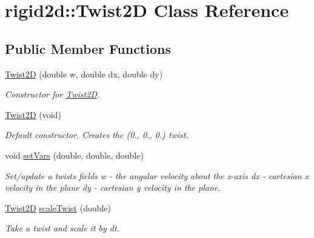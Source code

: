 \hypertarget{classrigid2d_1_1Twist2D}{}\section{rigid2d\+:\+:Twist2D Class Reference}
\label{classrigid2d_1_1Twist2D}
\subsection*{Public Member Functions}
\begin{DoxyCompactItemize}
\item 
\hyperlink{classrigid2d_1_1Twist2D_af389fe01053df9f380a252acb27bd2a7}{Twist2D} (double w, double dx, double dy)
\begin{DoxyCompactList}\small\item\em Constructor for \hyperlink{classrigid2d_1_1Twist2D}{Twist2D}. \end{DoxyCompactList}\item 
\mbox{\label{classrigid2d_1_1Twist2D_a3c6a0ed4e27f7c179ccc1fac93d4ac30}} 
\hyperlink{classrigid2d_1_1Twist2D_a3c6a0ed4e27f7c179ccc1fac93d4ac30}{Twist2D} (void)
\begin{DoxyCompactList}\small\item\em Default constructor. Creates the (0., 0., 0.) twist. \end{DoxyCompactList}\item 
\mbox{\label{classrigid2d_1_1Twist2D_a79fe58069e57184bb5b8beeb21ca3988}} 
void \hyperlink{classrigid2d_1_1Twist2D_a79fe58069e57184bb5b8beeb21ca3988}{set\+Vars} (double, double, double)
\begin{DoxyCompactList}\small\item\em Set/update a twist\textquotesingle{}s fields  w -\/ the angular velocity about the z-\/axis  dx -\/ cartesian x velocity in the plane  dy -\/ cartesian y velocity in the plane. \end{DoxyCompactList}\item 
\hyperlink{classrigid2d_1_1Twist2D}{Twist2D} \hyperlink{classrigid2d_1_1Twist2D_a777041352439c853197d2bca414ec4cf}{scale\+Twist} (double)
\begin{DoxyCompactList}\small\item\em Take a twist and scale it by dt. \end{DoxyCompactList}\item 

\end{DoxyCompactItemize}
